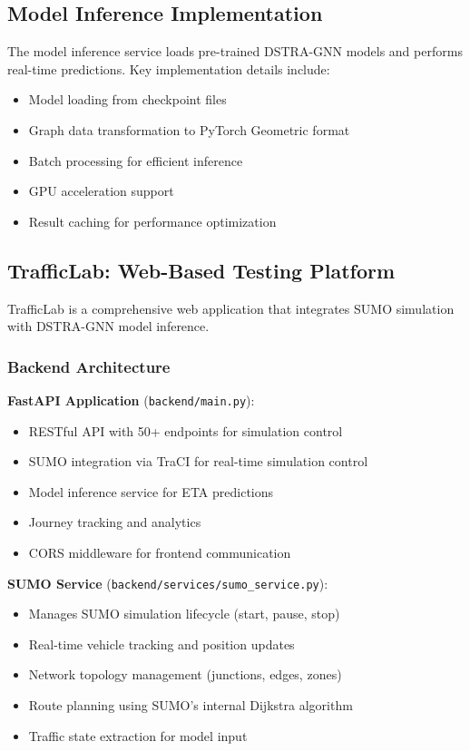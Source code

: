 \subsection{Model Inference Implementation}

The model inference service loads pre-trained DSTRA-GNN models and performs real-time predictions. Key implementation details include:

\begin{itemize}
    \item Model loading from checkpoint files
    \item Graph data transformation to PyTorch Geometric format
    \item Batch processing for efficient inference
    \item GPU acceleration support
    \item Result caching for performance optimization
\end{itemize}

\subsection{TrafficLab: Web-Based Testing Platform}

TrafficLab is a comprehensive web application that integrates SUMO simulation with DSTRA-GNN model inference.

\subsubsection{Backend Architecture}

\textbf{FastAPI Application} (\texttt{backend/main.py}):
\begin{itemize}
    \item RESTful API with 50+ endpoints for simulation control
    \item SUMO integration via TraCI for real-time simulation control
    \item Model inference service for ETA predictions
    \item Journey tracking and analytics
    \item CORS middleware for frontend communication
\end{itemize}

\textbf{SUMO Service} (\texttt{backend/services/sumo\_service.py}):
\begin{itemize}
    \item Manages SUMO simulation lifecycle (start, pause, stop)
    \item Real-time vehicle tracking and position updates
    \item Network topology management (junctions, edges, zones)
    \item Route planning using SUMO's internal Dijkstra algorithm
    \item Traffic state extraction for model input
\end{itemize}

